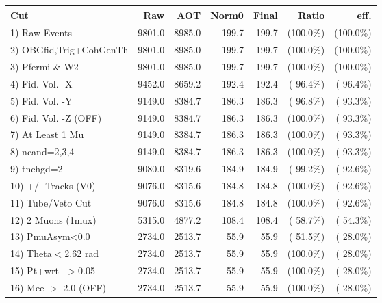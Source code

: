  \begin{table}[h!]\centering
 \begin{tabular}{||l||r|r|r|r|r|r||}
 \hline
 \hline
 Cut & Raw & AOT & Norm0 & Final & Ratio & eff.       \\
 \hline
  1) Raw Events           &       9801.0 &       8985.0 &        199.7 &        199.7 & (100.0\%) & (100.0\%) \\
  2) OBGfid,Trig+CohGenTh &       9801.0 &       8985.0 &        199.7 &        199.7 & (100.0\%) & (100.0\%) \\
  3) Pfermi \& W2         &       9801.0 &       8985.0 &        199.7 &        199.7 & (100.0\%) & (100.0\%) \\
  4) Fid. Vol. -X         &       9452.0 &       8659.2 &        192.4 &        192.4 & ( 96.4\%) & ( 96.4\%) \\
  5) Fid. Vol. -Y         &       9149.0 &       8384.7 &        186.3 &        186.3 & ( 96.8\%) & ( 93.3\%) \\
  6) Fid. Vol. -Z (OFF)   &       9149.0 &       8384.7 &        186.3 &        186.3 & (100.0\%) & ( 93.3\%) \\
  7) At Least 1 Mu        &       9149.0 &       8384.7 &        186.3 &        186.3 & (100.0\%) & ( 93.3\%) \\
  8) ncand=2,3,4          &       9149.0 &       8384.7 &        186.3 &        186.3 & (100.0\%) & ( 93.3\%) \\
  9) tnchgd=2             &       9080.0 &       8319.6 &        184.9 &        184.9 & ( 99.2\%) & ( 92.6\%) \\
 10) +/- Tracks (V0)      &       9076.0 &       8315.6 &        184.8 &        184.8 & (100.0\%) & ( 92.6\%) \\
 11) Tube/Veto Cut        &       9076.0 &       8315.6 &        184.8 &        184.8 & (100.0\%) & ( 92.6\%) \\
 12) 2 Muons (1mux)       &       5315.0 &       4877.2 &        108.4 &        108.4 & ( 58.7\%) & ( 54.3\%) \\
 13) PmuAsym<0.0          &       2734.0 &       2513.7 &         55.9 &         55.9 & ( 51.5\%) & ( 28.0\%) \\
 14) Theta$<$2.62 rad     &       2734.0 &       2513.7 &         55.9 &         55.9 & (100.0\%) & ( 28.0\%) \\
 15) Pt+wrt- $>$0.05      &       2734.0 &       2513.7 &         55.9 &         55.9 & (100.0\%) & ( 28.0\%) \\
 16) Mee $>$ 2.0  (OFF)   &       2734.0 &       2513.7 &         55.9 &         55.9 & (100.0\%) & ( 28.0\%) \\

\end{tabular}
\end{table}
